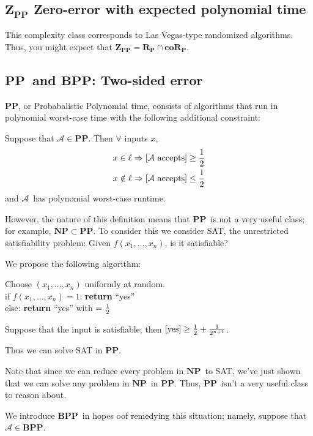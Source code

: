 \documentclass[11pt]{article}
\let\Pr\relax
\DeclareMathOperator*{\Pr}{\mathbb{P}}
\newcommand{\NP}{\ensuremath{\mathbf{NP}}}
\newcommand{\PP}{\ensuremath{\mathbf{PP}}}
\newcommand{\BPP}{\ensuremath{\mathbf{BPP}}}
\newcommand{\ZPP}{\ensuremath{\mathbf{Z_{PP}}}}
\newcommand{\RP}{\ensuremath{\mathbf{R_{P}}}}
\newcommand{\coRP}{\ensuremath{\mathbf{coR_{P}}}}
\newcommand{\Alg}{\ensuremath{\mathcal{A}}}
\begin{document}
\subsection{\ZPP\: Zero-error with expected polynomial time}

This complexity class corresponds to Las Vegas-type randomized algorithms. Thus, you might expect that $\ZPP = \RP \cap \coRP$.

\subsection{\PP\ and \BPP: Two-sided error }

\PP, or Probabalistic Polynomial time, consists of algorithms that run in polynomial worst-case time with the following additional constraint:

Suppose that $\Alg\in\PP$. Then $\forall$ inputs $x$,
\begin{align*}
  x \in \ell &\Rightarrow \Pr[\Alg \text{ accepts}] \ge \frac{1}{2} \\
  x \notin \ell &\Rightarrow \Pr[\Alg \text{ accepts}] \le \frac{1}{2} \\
\end{align*}
and \Alg\ has polynomial worst-case runtime.

However, the nature of this definition means that \PP\ is not a very useful class; for example, $\NP\subset\PP$. To consider this we consider SAT, the unrestricted satisfiability problem: Given $f(x_1, \dots, x_n)$, is it satisfiable?

We propose the following algorithm: %

Choose $(x_1, \dots, x_n)$ uniformly at random. \\
 if $f(x_1, \dots, x_n) = 1$: \textbf{return} ``yes''\\
 else: \textbf{return} ``yes'' with $\Pr = \frac{1}{2}$

Suppose that the input is satisfiable; then $\Pr[\text{yes}] \geq \frac{1}{2} + \frac{1}{2^{n+1}}$.

Thus we can solve SAT in \PP.

Note that since we can reduce every problem in \NP\ to SAT, we've just shown that we can solve any problem in \NP\ in \PP. Thus, \PP\ isn't a very useful class to reason about.

We introduce \BPP\ in hopes oof remedying this situation; namely, suppose that $\Alg\in\BPP$. 
\end{document}
